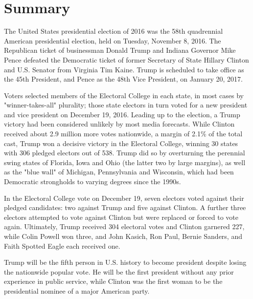\section{Summary}
The United States presidential election of 2016 was the 58th quadrennial American presidential election, held on Tuesday, November 8, 2016. The Republican ticket of businessman Donald Trump and Indiana Governor Mike Pence defeated the Democratic ticket of former Secretary of State Hillary Clinton and U.S. Senator from Virginia Tim Kaine. Trump is scheduled to take office as the 45th President, and Pence as the 48th Vice President, on January 20, 2017.

Voters selected members of the Electoral College in each state, in most cases by "winner-takes-all" plurality; those state electors in turn voted for a new president and vice president on December 19, 2016. Leading up to the election, a Trump victory had been considered unlikely by most media forecasts. While Clinton received about 2.9 million more votes nationwide, a margin of 2.1\% of the total cast, Trump won a decisive victory in the Electoral College, winning 30 states with 306 pledged electors out of 538. Trump did so by overturning the perennial swing states of Florida, Iowa and Ohio (the latter two by large margins), as well as the "blue wall" of Michigan, Pennsylvania and Wisconsin, which had been Democratic strongholds to varying degrees since the 1990s.

In the Electoral College vote on December 19, seven electors voted against their pledged candidates: two against Trump and five against Clinton. A further three electors attempted to vote against Clinton but were replaced or forced to vote again. Ultimately, Trump received 304 electoral votes and Clinton garnered 227, while Colin Powell won three, and John Kasich, Ron Paul, Bernie Sanders, and Faith Spotted Eagle each received one.

Trump will be the fifth person in U.S. history to become president despite losing the nationwide popular vote. He will be the first president without any prior experience in public service, while Clinton was the first woman to be the presidential nominee of a major American party.

